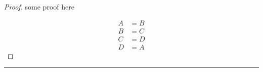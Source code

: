 \documentclass[a4paper, 11pt]{article}
\begin{document}
\begin{proof}
some proof here


	\begin{align}
		A &= B \\
		B &= C \\
		C &= D \\
		D &= A
	\end{align}


\end{proof}



\hrule
\end{document}
